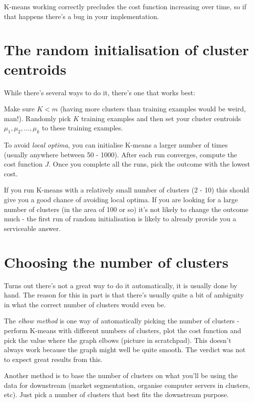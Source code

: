 K-means working correctly precludes the cost function increasing over time, so if that happens there's a bug in your implementation.

\section{The random initialisation of cluster centroids}

While there's several ways to do it, there's one that works best:

Make sure $K < m$ (having more clusters than training examples would be weird, man!). Randomly pick $K$ training examples and then set your cluster centroids $\mu_1, \mu_2, \dots, \mu_k$ to these training examples.

To avoid \emph{local optima}, you can initialise K-means a larger number of times (usually anywhere between 50 - 1000). After each run converges, compute the cost function $J$. Once you complete all the runs, pick the outcome with the lowest cost.

If you run K-means with a relatively small number of clusters (2 - 10) this should give you a good chance of avoiding local optima. If you are looking for a large number of clusters (in the area of 100 or so) it's not likely to change the outcome much - the first run of random initialisation is likely to already provide you a serviceable answer.

\section{Choosing the number of clusters}

Turns out there's not a great way to do it automatically, it is usually done by hand. The reason for this in part is that there's usually quite a bit of ambiguity in what the correct number of clusters would even be.

The \emph{elbow method} is one way of automatically picking the number of clusters - perform K-means with different numbers of clusters, plot the cost function and pick the value where the graph elbows (picture in scratchpad). This doesn't always work because the graph might well be quite smooth. The verdict was not to expect great results from this.

Another method is to base the number of clusters on what you'll be using the data for downstream (market segmentation, organise computer servers in clusters, etc). Just pick a number of clusters that best fits the downstream purpose.

